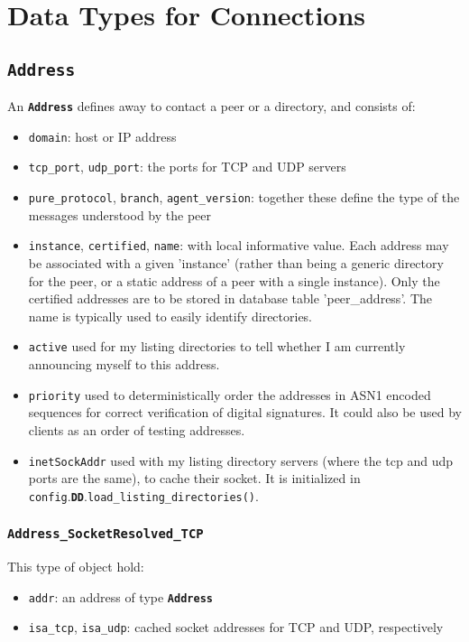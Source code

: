 \documentclass{book}
\newcommand{\pkg}[1]{{\tt #1}}
\newcommand{\cls}[1]{{\tt\bf #1}}
\newcommand{\mth}[1]{{\tt #1}}
\newcommand{\mmb}[1]{{\tt #1}}
\begin{document}
\section{Data Types for Connections}


\subsection{\cls{Address}}
An \cls{Address} defines away to contact a peer or a directory, and consists of:
\begin{itemize}
\item
\mmb{domain}: host or IP address
\item
\mmb{tcp\_port}, \mmb{udp\_port}: the ports for TCP and UDP servers
\item
\mmb{pure\_protocol}, \mmb{branch}, \mmb{agent\_version}: together these define the type of the messages understood by the peer
\item
\mmb{instance},  \mmb{certified}, \mmb{name}: with local informative value. Each address may be associated with a given 'instance' (rather than being a generic directory for the peer, or a static address of a peer with a single instance). Only the certified addresses are to be stored in database table 'peer\_address'. The name is typically used to easily identify directories.
\item
\mmb{active} used for my listing directories to tell whether I am currently announcing myself to this address.
\item
\mmb{priority} used to deterministically order the addresses in ASN1 encoded sequences for correct verification of digital signatures.
It could also be used by clients as an order of testing addresses. 
\item
\mmb{inetSockAddr} used with my listing directory servers (where the tcp and udp ports are the same), to cache their socket. It
is initialized in \pkg{config}.\cls{DD}.\mth{load\_listing\_directories()}.
\end{itemize}

\subsubsection{\cls{Address\_SocketResolved\_TCP}}

This type of object hold:
\begin{itemize}
\item
\mmb{addr}: an address of type \cls{Address}
\item
\mmb{isa\_tcp}, \mmb{isa\_udp}:  cached socket addresses for TCP and UDP, respectively
\end{itemize}
\end{document}
